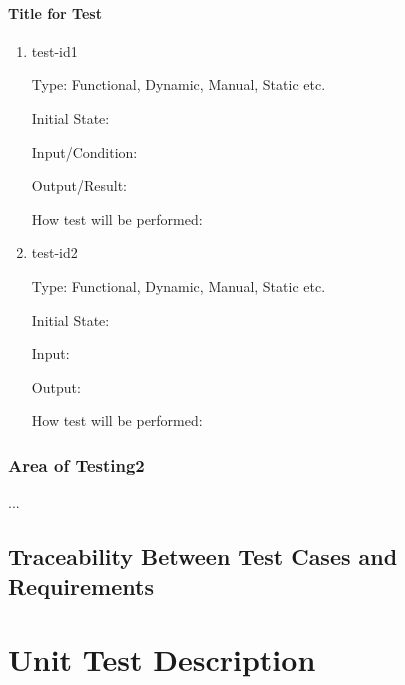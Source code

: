 \documentclass[12pt, titlepage]{article}
\begin{document}
\paragraph{Title for Test}

\begin{enumerate}

\item{test-id1\\}

Type: Functional, Dynamic, Manual, Static etc.
					
Initial State: 
					
Input/Condition: 
					
Output/Result: 
					
How test will be performed: 
					
\item{test-id2\\}

Type: Functional, Dynamic, Manual, Static etc.
					
Initial State: 
					
Input: 
					
Output: 
					
How test will be performed: 

\end{enumerate}

\subsubsection{Area of Testing2}

...

\subsection{Traceability Between Test Cases and Requirements}


\section{Unit Test Description}


\end{document}
